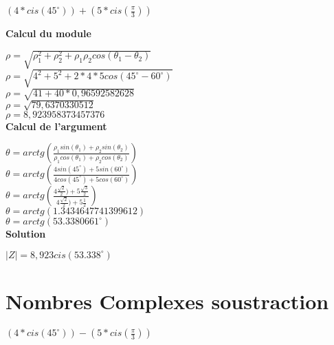 $(4 * cis(45^{\circ} )) + (5 * cis(\frac{\pi}{3}))$

\vspace{10mm}
\textbf{Calcul du module}
\vspace{5mm}

$\rho = \sqrt{\rho_{1}^{2} + \rho_{2}^{2} + \rho_{1} \rho_{2} cos(\theta_{1} - \theta_{2}) }$ \\

$\rho = \sqrt{4^{2} + 5^{2} + 2 * 4 * 5 cos(45^{\circ} - 60^{\circ})}$ \\

$\rho = \sqrt{41 + 40 * 0,96592582628}$ \\

$\rho = \sqrt{79,6370330512}$ \\

$\rho = 8,923958373457376 $ \\

\vspace{6mm}
\textbf{Calcul de l'argument}
\vspace{5mm}

$\theta = arctg(\frac{\rho_{1}sin(\theta_{1}) + \rho_{2}sin(\theta_{2})} {\rho_{1}cos(\theta_{1}) + \rho_{2}cos(\theta_{2})} )$ \\

$\theta = arctg(\frac{4sin(45^{\circ}) + 5sin(60^{\circ})} {4cos(45^{\circ}) + 5cos(60^{\circ})} )$ \\

$\theta = arctg(\frac{4\frac{\sqrt{2}}{2}) + 5\frac{\sqrt{3}}{2} } {4\frac{\sqrt{2}}{2}) + 5\frac{1}{2}})$ \\

$\theta = arctg(1.3434647741399612)$ \\

$\theta = arctg(53.3380661^{\circ})$ \\

\vspace{6mm}
\textbf{Solution}
\vspace{5mm}

$|Z| = 8,923 cis(53.338^{\circ})$


\newpage
\section{Nombres Complexes soustraction}
\vspace{3mm} %

$(4 * cis(45^{\circ} )) - (5 * cis(\frac{\pi}{3}))$


